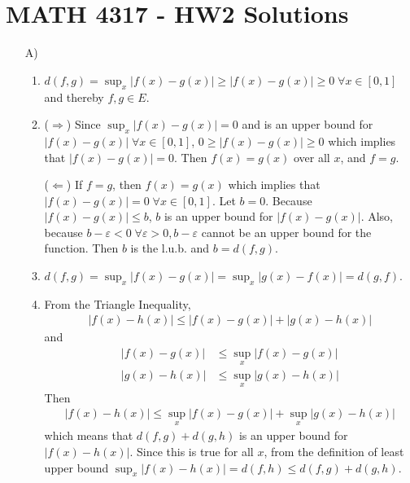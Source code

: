 \documentclass[a4paper,12pt]{article}
\begin{document}
    \section*{MATH 4317 - HW2 Solutions}
    \begin{enumerate}
        \item[A)]
            \begin{enumerate}[label = (\roman*)]
                \item
                    $d(f, g) = \sup_x|f(x) - g(x)| \geq |f(x) - g(x)| \geq 0 \; \forall x \in [0, 1]$ and thereby $f, g \in E$.

                \item
                    ($\Rightarrow$) Since $\sup_x|f(x) - g(x)| = 0$ and is an upper bound for $|f(x) - g(x)| \; \forall x \in [0, 1]$, $0 \geq |f(x) - g(x)| \geq 0$ which implies that $|f(x) - g(x)| = 0$. Then $f(x) = g(x)$ over all $x$, and $f = g$. \par
                    ($\Leftarrow$) If $f = g$, then $f(x) = g(x)$ which implies that $|f(x) - g(x)| = 0 \; \forall x \in [0, 1]$. Let $b = 0$. Because $|f(x) - g(x)| \leq b$, $b$ is an upper bound for $|f(x) - g(x)|$. Also, because $b - \varepsilon < 0 \; \forall \varepsilon > 0, b - \varepsilon$ cannot be an upper bound for the function. Then $b$ is the l.u.b. and $b = d(f, g)$.

                \item
                    $d(f, g) = \sup_x|f(x) - g(x)| = \sup_x|g(x) - f(x)| = d(g, f)$.

                \item
                    From the Triangle Inequality,
                    \begin{align*}
                        |f(x) - h(x)| \leq |f(x) - g(x)| + |g(x) - h(x)|
                    \end{align*}
                    and
                    \begin{align*}
                        |f(x) - g(x)| &\leq \sup_x|f(x) - g(x)| \\
                        |g(x) - h(x)| &\leq \sup_x|g(x) - h(x)|
                    \end{align*}
                    Then
                    \begin{align*}
                        |f(x) - h(x)| \leq \sup_x|f(x) - g(x)| + \sup_x|g(x) - h(x)|
                    \end{align*}
                    which means that $d(f, g) + d(g, h)$ is an upper bound for $|f(x) - h(x)|$. Since this is true for all $x$, from the definition of least upper bound $\sup_x|f(x) - h(x)| = d(f, h) \leq d(f, g) + d(g, h)$.
            \end{enumerate}


\end{enumerate}
\end{document}
